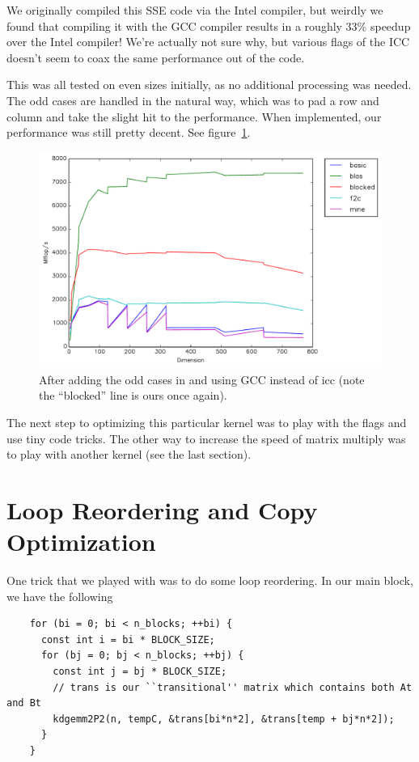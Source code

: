 \documentclass{article}
\begin{document}
  We originally compiled this SSE code via the Intel compiler, but weirdly we found that compiling it with the GCC compiler results in a roughly
  33\% speedup over the Intel compiler! We're actually not sure why, but various flags of the ICC doesn't seem to coax the same performance
  out of the code.

  This was all tested on even sizes initially, as no additional processing was needed. The odd cases are handled in the natural way, which was to pad a row and column and take the slight hit to the performance.
  When implemented, our performance was still pretty decent. See figure~\ref{fig:odd}.

  \begin{figure}[h]
    \centering
    \includegraphics[width=.7\textwidth]{odd.pdf}
    \caption{After adding the odd cases in and using GCC instead of icc (note the ``blocked'' line is ours once again).}
    \label{fig:odd}
  \end{figure}

  The next step to optimizing this particular kernel was to play with the flags and use tiny code tricks. The other way to increase the speed of matrix multiply was to play with another kernel (see the last section).

  \section{Loop Reordering and Copy Optimization}
    One trick that we played with was to do some loop reordering. In our main block, we have the following

    \begin{lstlisting}
    for (bi = 0; bi < n_blocks; ++bi) {
      const int i = bi * BLOCK_SIZE;
      for (bj = 0; bj < n_blocks; ++bj) {
        const int j = bj * BLOCK_SIZE;
        // trans is our ``transitional'' matrix which contains both At and Bt
        kdgemm2P2(n, tempC, &trans[bi*n*2], &trans[temp + bj*n*2]);
      }
    }
    \end{lstlisting}
\end{document}

